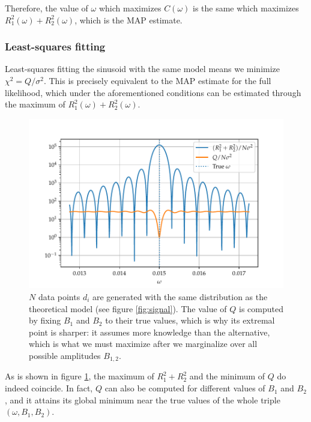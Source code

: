 \documentclass[main.tex]{subfiles}
\begin{document}
Therefore, the value of \(\omega \) which maximizes \(C(\omega )\) is the same which maximizes \(R_1^2 (\omega ) + R_2^2 (\omega )\), which is the MAP estimate. 

\subsubsection{Least-squares fitting}

Least-squares fitting the sinusoid with the same model means we minimize \(\chi^2 =  Q / \sigma^2\).
This is precisely equivalent to the MAP estimate for the full likelihood, which under the aforementioned conditions can be estimated through the maximum of \(R_1^2(\omega ) + R_2^2(\omega )\). 

\begin{figure}[ht]
\centering
\includegraphics[width=\textwidth]{figures/chisquare_omega.pdf}
\caption{\(N\) data points \(d_i\) are generated with the same distribution as the theoretical model (see figure \ref{fig:signal}). The value of \(Q\) is computed by fixing \(B_1 \) and \(B_2 \) to their true values, which is why its extremal point is sharper: it assumes more knowledge than the alternative, which is what we must maximize after we marginalize over all possible amplitudes \(B_{1, 2}\). }
\label{fig:chisquare_omega}
\end{figure}

As is shown in figure \ref{fig:chisquare_omega}, the maximum of \(R_1^2 + R_2^2\) and the minimum of \(Q\) do indeed coincide. In fact, \(Q\) can also be computed for different values of \(B_1 \) and \(B_2 \), and it attains its global minimum near the true values of the whole triple \((\omega , B_1 , B_2 )\).
\end{document}
